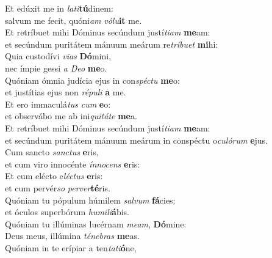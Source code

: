 \evenverse Et edúxit me in \textit{la}\textit{ti}\textbf{tú}dinem:~\*\\
\evenverse salvum me fecit, quóni\textit{am} \textit{vó}\textit{lu}\textbf{it} me.\\
\oddverse Et retríbuet mihi Dóminus secúndum justí\textit{ti}\textit{am} \textbf{me}am:~\*\\
\oddverse et secúndum puritátem mánuum meárum re\textit{trí}\textit{bu}\textit{et} \textbf{mi}hi:\\
\evenverse Quia custodívi \textit{vi}\textit{as} \textbf{Dó}mini,~\*\\
\evenverse nec ímpie gessi \textit{a} \textit{De}\textit{o} \textbf{me}o.\\
\oddverse Quóniam ómnia judícia ejus in con\textit{spé}\textit{ctu} \textbf{me}o:~\*\\
\oddverse et justítias ejus non \textit{ré}\textit{pu}\textit{li} \textbf{a} me.\\
\evenverse Et ero immaculá\textit{tus} \textit{cum} \textbf{e}o:~\*\\
\evenverse et observábo me ab ini\textit{qui}\textit{tá}\textit{te} \textbf{me}a.\\
\oddverse Et retríbuet mihi Dóminus secúndum justí\textit{ti}\textit{am} \textbf{me}am:~\*\\
\oddverse et secúndum puritátem mánuum meárum in conspéctu o\textit{cu}\textit{ló}\textit{rum} \textbf{e}jus.\\
\evenverse Cum sancto \textit{san}\textit{ctus} \textbf{e}ris,~\*\\
\evenverse et cum viro innocénte \textit{ín}\textit{no}\textit{cens} \textbf{e}ris:\\
\oddverse Et cum elécto e\textit{lé}\textit{ctus} \textbf{e}ris:~\*\\
\oddverse et cum pervér\textit{so} \textit{per}\textit{ver}\textbf{té}ris.\\
\evenverse Quóniam tu pópulum húmilem \textit{sal}\textit{vum} \textbf{fá}cies:~\*\\
\evenverse et óculos superbórum \textit{hu}\textit{mi}\textit{li}\textbf{á}bis.\\
\oddverse Quóniam tu illúminas lucérnam \textit{me}\textit{am}, \textbf{Dó}mine:~\*\\
\oddverse Deus meus, illúmina \textit{té}\textit{ne}\textit{bras} \textbf{me}as.\\
\evenverse Quóniam in te erípiar a ten\textit{ta}\textit{ti}\textbf{ó}ne,~\*\\
